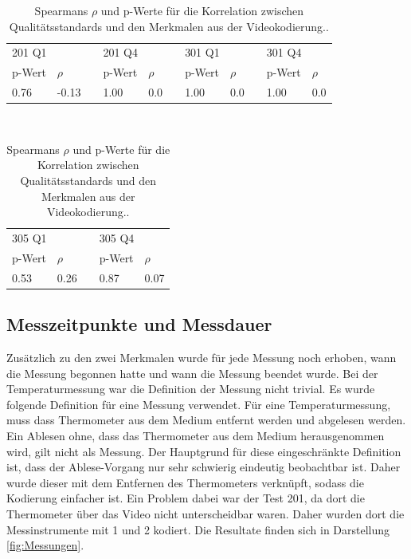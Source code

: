  \begin{table}[htbp]
   \centering
 \begin{tabular}{@{}lllllllllll@{}}
 \toprule
    \multicolumn{2}{l}{201 Q1} &&  \multicolumn{2}{l}{201 Q4}&&  \multicolumn{2}{l}{301 Q1}&&  \multicolumn{2}{l}{301 Q4} \\ 
       \cmidrule{1-2}\cmidrule{4-5}\cmidrule{7-8}\cmidrule{10-11}
    p-Wert & $\rho$ && p-Wert & $\rho$  && p-Wert & $\rho$&& p-Wert & $\rho$\\ 
 \midrule
    0.76 & -0.13 && 1.00 & 0.0 && 1.00 & 0.0 && 1.00 & 0.0     \\ 
 
 \bottomrule
 \end{tabular} \\[0.75cm]
 \begin{tabular}{@{}lllll@{}}
  \toprule
       \multicolumn{2}{l}{305 Q1}&&  \multicolumn{2}{l}{305 Q4}\\ 
        \cmidrule{1-2}\cmidrule{4-5}
      p-Wert & $\rho$&& p-Wert & $\rho$\\ 
  \midrule
      0.53 & 0.26 && 0.87 & 0.07    \\ 
  
  \bottomrule
  \end{tabular} 
   \caption{Spearmans $\rho$ und p-Werte für die Korrelation zwischen Qualitätsstandards und den Merkmalen aus der Videokodierung..  }
   \label{tab:CorVideoQ}
 \end{table}
 
  \subsection{Messzeitpunkte und Messdauer}
  
  Zusätzlich zu den zwei Merkmalen wurde für jede Messung noch erhoben, wann die Messung begonnen hatte und wann die Messung beendet wurde. Bei der Temperaturmessung war die Definition der Messung nicht trivial. Es wurde folgende Definition für eine Messung verwendet. Für eine Temperaturmessung, muss dass Thermometer aus dem Medium entfernt werden und abgelesen werden. Ein Ablesen ohne, dass das Thermometer aus dem Medium herausgenommen wird, gilt nicht als Messung. Der Hauptgrund für diese eingeschränkte Definition ist, dass der Ablese-Vorgang nur sehr schwierig eindeutig beobachtbar ist. Daher wurde dieser mit dem Entfernen des Thermometers verknüpft, sodass die Kodierung einfacher ist. Ein Problem dabei war der Test 201, da dort die Thermometer über das Video nicht unterscheidbar waren. Daher wurden dort die Messinstrumente mit 1 und 2 kodiert. Die Resultate finden sich in Darstellung \ref{fig:Messungen}.
  

